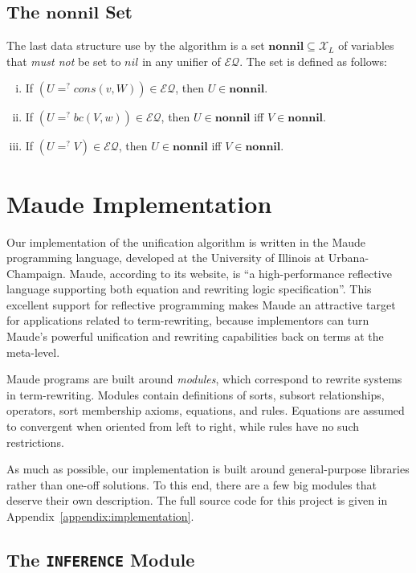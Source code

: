 \documentclass[11pt]{article}
\newcommand{\ueq}{=_{}^?}
\newcommand{\X}{\mathcal{X}}
\newcommand{\EQ}{\mathcal{EQ}}
\newcommand{\Bc}{\mathit{bc}}
\newcommand{\Cons}{\mathit{cons}}
\newcommand{\Nil}{\mathit{nil}}
\newcommand{\Nonnil}{\mathbf{nonnil}}
\begin{document}
\subsection{The $\Nonnil$ Set}\label{subsection:nonnil}

The last data structure use by the algorithm is a set $\Nonnil \subseteq \X_L$
of variables that \emph{must not} be set to $\Nil$ in any unifier of $\EQ$. The
set is defined as follows:
\begin{enumerate}[(i)]
    \item If $(U \ueq \Cons(v, W)) \in \EQ$, then $U \in \Nonnil$.
    \item If $(U \ueq \Bc(V, w)) \in \EQ$, then $U \in \Nonnil$ iff $V \in \Nonnil$.
    \item If $(U \ueq V) \in \EQ$, then $U \in \Nonnil$ iff $V \in \Nonnil$.
\end{enumerate}

\section{Maude Implementation}\label{section:maude}

Our implementation of the unification algorithm is written in the Maude
programming language, developed at the University of Illinois at
Urbana-Champaign. Maude, according to its website, is ``a high-performance
reflective language supporting both equation and rewriting logic
specification''. This excellent support for reflective programming makes Maude
an attractive target for applications related to term-rewriting, because
implementors can turn Maude's powerful unification and rewriting capabilities
back on terms at the meta-level.

Maude programs are built around \emph{modules}, which correspond to rewrite
systems in term-rewriting. Modules contain definitions of sorts, subsort
relationships, operators, sort membership axioms, equations, and rules.
Equations are assumed to convergent when oriented from left to right, while
rules have no such restrictions.

As much as possible, our implementation is built around general-purpose
libraries rather than one-off solutions. To this end, there are a few big
modules that deserve their own description. The full source code for this
project is given in Appendix~\ref{appendix:implementation}.

\subsection{The \lstinline|INFERENCE| Module}\label{subsection:inference-mod}
\end{document}
